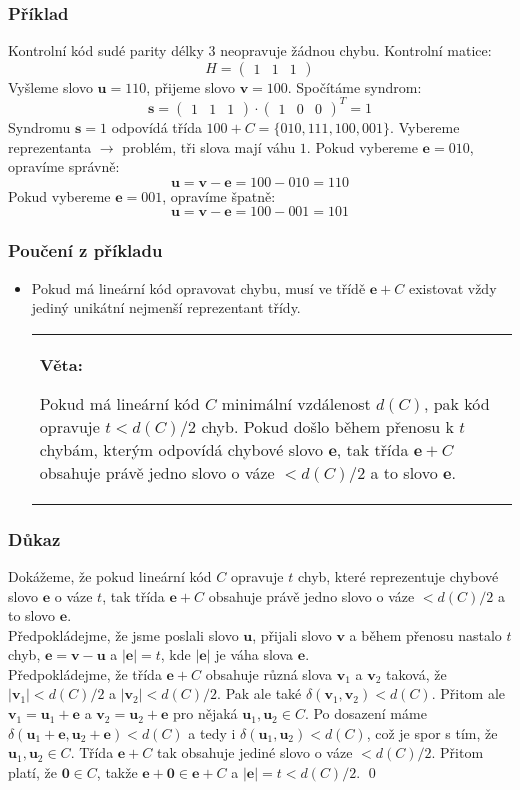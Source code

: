 \documentclass{beamer}
\newenvironment{veta}
{
    \begin{center}
    \begin{tabular}{p{9cm}}
    \textbf{Věta:}
}
{
    \end{tabular}
    \end{center}
}
\newcommand{\vu}{\textbf{u}}
\newcommand{\vv}{\textbf{v}}
\newcommand{\e}{\textbf{e}}
\newcommand{\s}{\textbf{s}}
\newcommand{\zero}{\textbf{0}}
\newcommand{\emptyline}{\\$\,$\\}
\newenvironment{itemizey}%
  {\large \begin{itemize}%
    \setlength{\itemsep}{6pt}%
    \setlength{\parskip}{6pt}}%
  {\end{itemize}}
\begin{document}
\begin{frame}[t,fragile]\frametitle{Příklad} 
Kontrolní kód sudé parity délky $3$ neopravuje žádnou chybu. Kontrolní matice:
$$
H=
\begin{pmatrix}
1&1&1
\end{pmatrix}
$$
Vyšleme slovo $\vu=110$, přijeme slovo $\vv=100$. Spočítáme syndrom:
$$
\s=
\begin{pmatrix}
1&1&1
\end{pmatrix}
\cdot
\begin{pmatrix}
1&0&0
\end{pmatrix}^T
=1
$$
Syndromu $\s=1$ odpovídá třída $100+C=\{010, 111, 100, 001\}$. Vybereme reprezentanta $\longrightarrow$ problém, tři slova mají váhu $1$. Pokud vybereme $\e=010$, opravíme správně:
$$
\vu=\vv-\e=100-010=110
$$
Pokud vybereme $\e=001$, opravíme špatně:
$$
\vu=\vv-\e=100-001=101
$$
\end{frame}


\begin{frame}[t,fragile]\frametitle{Poučení z příkladu} 
    \begin{itemizey}
        \item Pokud má lineární kód opravovat chybu, musí ve třídě $\e+C$ existovat vždy jediný unikátní nejmenší reprezentant třídy.
        \begin{veta}
        Pokud má lineární kód $C$ minimální vzdálenost $d(C)$, pak kód opravuje $t<d(C)/2$ chyb. Pokud došlo během přenosu k $t$ chybám, kterým odpovídá chybové slovo $\e$, tak třída $\e+C$ obsahuje právě jedno slovo o váze $<d(C)/2$ a to slovo $\e$.
        \end{veta}
    \end{itemizey}
\end{frame}


\begin{frame}[t,fragile]\frametitle{Důkaz} 
Dokážeme, že pokud lineární kód $C$ opravuje $t$ chyb, které reprezentuje chybové slovo $\e$ o váze $t$, tak třída $\e+C$ obsahuje právě jedno slovo o váze $<d(C)/2$ a to slovo $\e$.
\emptyline
Předpokládejme, že jsme poslali slovo $\vu$, přijali slovo $\vv$ a během přenosu nastalo $t$ chyb, $\e=\vv-\vu$ a $|\e|=t$, kde $|\e|$ je váha slova $\e$.
\emptyline
Předpokládejme, že třída $\e+C$ obsahuje různá slova $\vv_1$ a $\vv_2$ taková, že $|\vv_1|<d(C)/2$ a $|\vv_2|<d(C)/2$. Pak ale také $\delta(\vv_1, \vv_2)<d(C)$. Přitom ale $\vv_1=\vu_1+\e$ a $\vv_2=\vu_2+\e$ pro nějaká $\vu_1, \vu_2\in C$. Po dosazení máme $\delta(\vu_1+\e, \vu_2+\e)<d(C)$ a tedy i $\delta(\vu_1, \vu_2)<d(C)$, což je spor s tím, že $\vu_1, \vu_2\in C$. Třída $\e+C$ tak obsahuje jediné slovo o váze $<d(C)/2$. Přitom platí, že $\zero\in C$, takže $\e+\zero\in\e+C$ a $|\e|=t<d(C)/2$. \qed
\end{frame}
\end{document}
